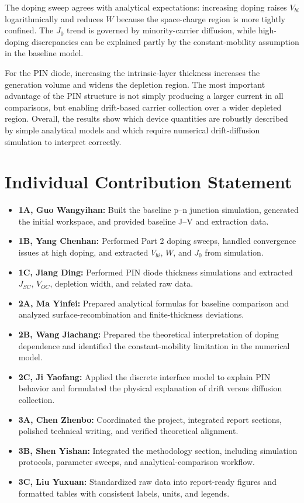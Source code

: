 \documentclass[11pt,a4paper]{article}
\newcommand{\jzero}{J_0}
\newcommand{\jsc}{J_{SC}}
\newcommand{\voc}{V_{OC}}
\newcommand{\vbi}{V_{bi}}
\begin{document}
The doping sweep agrees with analytical expectations: increasing doping raises $\vbi$ logarithmically and reduces $W$ because the space-charge region is more tightly confined. The $\jzero$ trend is governed by minority-carrier diffusion, while high-doping discrepancies can be explained partly by the constant-mobility assumption in the baseline model.

For the PIN diode, increasing the intrinsic-layer thickness increases the generation volume and widens the depletion region. The most important advantage of the PIN structure is not simply producing a larger current in all comparisons, but enabling drift-based carrier collection over a wider depleted region. Overall, the results show which device quantities are robustly described by simple analytical models and which require numerical drift-diffusion simulation to interpret correctly.

\section*{Individual Contribution Statement}

\begin{itemize}[leftmargin=2em]
    \item \textbf{1A, Guo Wangyihan:} Built the baseline p--n junction simulation, generated the initial workspace, and provided baseline J--V and extraction data.
    \item \textbf{1B, Yang Chenhan:} Performed Part 2 doping sweeps, handled convergence issues at high doping, and extracted $\vbi$, $W$, and $\jzero$ from simulation.
    \item \textbf{1C, Jiang Ding:} Performed PIN diode thickness simulations and extracted $\jsc$, $\voc$, depletion width, and related raw data.
    \item \textbf{2A, Ma Yinfei:} Prepared analytical formulas for baseline comparison and analyzed surface-recombination and finite-thickness deviations.
    \item \textbf{2B, Wang Jiachang:} Prepared the theoretical interpretation of doping dependence and identified the constant-mobility limitation in the numerical model.
    \item \textbf{2C, Ji Yaofang:} Applied the discrete interface model to explain PIN behavior and formulated the physical explanation of drift versus diffusion collection.
    \item \textbf{3A, Chen Zhenbo:} Coordinated the project, integrated report sections, polished technical writing, and verified theoretical alignment.
    \item \textbf{3B, Shen Yishan:} Integrated the methodology section, including simulation protocols, parameter sweeps, and analytical-comparison workflow.
    \item \textbf{3C, Liu Yuxuan:} Standardized raw data into report-ready figures and formatted tables with consistent labels, units, and legends.
\end{itemize}
\end{document}
